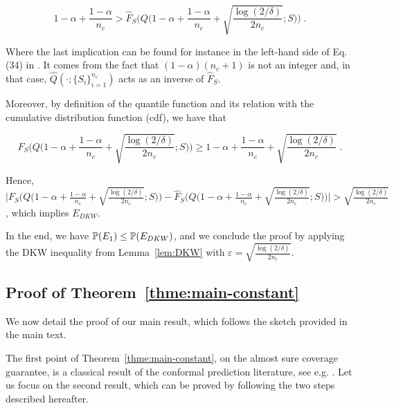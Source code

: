     \begin{equation*}
        1-\alpha + \frac{1-\alpha}{n_c} > \hat{F}_S\Big(Q\Big(1-\alpha + \frac{1-\alpha}{n_c} + \sqrt{\frac{\log(2/\delta)}{2n_c}}; S\Big)\Big)\;.
    \end{equation*}
    
    Where the last implication can be found for instance in the left-hand side of Eq. (34) in \citet{howard2022sequential}. It comes from the fact that $(1-\alpha)(n_c+1)$ is not an integer and, in that case, $\widehat{Q}(\cdot;\{S_i\}_{i=1}^{n_c})$ acts as an inverse of $\hat{F}_S$.
    
    
    Moreover, by definition of the quantile function and its relation with the cumulative distribution function (cdf), we have that 

    \begin{equation*}
        F_S\Big(Q\Big(1-\alpha + \frac{1-\alpha}{n_c} + \sqrt{\frac{\log(2/\delta)}{2n_c}}; S\Big)\Big)\geq 1-\alpha + \frac{1-\alpha}{n_c} + \sqrt{\frac{\log(2/\delta)}{2n_c}}\;.
    \end{equation*}

    Hence, $\Big|F_S\Big(Q\Big(1-\alpha + \frac{1-\alpha}{n_c} + \sqrt{\frac{\log(2/\delta)}{2n_c}}; S\Big)\Big) - \hat{F}_S\Big(Q\Big(1-\alpha + \frac{1-\alpha}{n_c} + \sqrt{\frac{\log(2/\delta)}{2n_c}}; S\Big)\Big)\Big| > \sqrt{\frac{\log(2/\delta)}{2n_c}}$, which implies $E_{DKW}$.
    
    In the end, we have ${\mathbb{P}}(E_1)\leq {\mathbb{P}}(E_{DKW})$, and we conclude the proof by applying the DKW inequality from Lemma~\ref{lem:DKW} with $\varepsilon = \sqrt{\frac{\log(2/\delta)}{2n_c}}$.

\subsection{Proof of Theorem~\ref{thme:main-constant}}
\label{app:proof-main}

We now detail the proof of our main result, which follows the sketch provided in the main text. 

The first point of Theorem~\ref{thme:main-constant}, on the almost sure coverage guarantee, is a classical result of the conformal prediction literature, see e.g. \citet[Theorem 2.2]{lei2018distribution}. 
    Let us focus on the second result, which can be proved by following the two steps described hereafter. 
    
